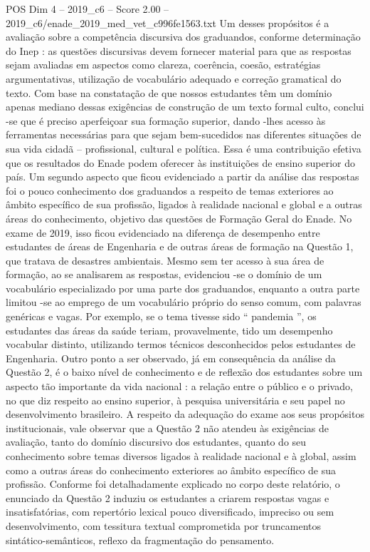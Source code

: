 \begin{textsample}{POS Dim 4 – 2019\_c6 – Score 2.00 – 2019\_c6/enade\_2019\_med\_vet\_c996fe1563.txt}
Um desses propósitos é a avaliação sobre a competência discursiva dos graduandos, conforme determinação do Inep : as questões discursivas devem fornecer material para que as respostas sejam avaliadas em aspectos como clareza, coerência, coesão, estratégias argumentativas, utilização de vocabulário adequado e correção gramatical do texto.
Com base na constatação de que nossos estudantes têm um domínio apenas mediano dessas exigências de construção de um texto formal culto, conclui -se que é preciso aperfeiçoar sua formação superior, dando -lhes acesso às ferramentas necessárias para que sejam bem-sucedidos nas diferentes situações de sua vida cidadã – profissional, cultural e política.
Essa é uma contribuição efetiva que os resultados do Enade podem oferecer às instituições de ensino superior do país.
Um segundo aspecto que ficou evidenciado a partir da análise das respostas foi o pouco conhecimento dos graduandos a respeito de temas exteriores ao âmbito específico de sua profissão, ligados à realidade nacional e global e a outras áreas do conhecimento, objetivo das questões de Formação Geral do Enade.
No exame de 2019, isso ficou evidenciado na diferença de desempenho entre estudantes de áreas de Engenharia e de outras áreas de formação na Questão 1, que tratava de desastres ambientais.
Mesmo sem ter acesso à sua área de formação, ao se analisarem as respostas, evidenciou -se o domínio de um vocabulário especializado por uma parte dos graduandos, enquanto a outra parte limitou -se ao emprego de um vocabulário próprio do senso comum, com palavras genéricas e vagas.
Por exemplo, se o tema tivesse sido “ pandemia ”, os estudantes das áreas da saúde teriam, provavelmente, tido um desempenho vocabular distinto, utilizando termos técnicos desconhecidos pelos estudantes de Engenharia.
Outro ponto a ser observado, já em consequência da análise da Questão 2, é o baixo nível de conhecimento e de reflexão dos estudantes sobre um aspecto tão importante da vida nacional : a relação entre o público e o privado, no que diz respeito ao ensino superior, à pesquisa universitária e seu papel no desenvolvimento brasileiro.
A respeito da adequação do exame aos seus propósitos institucionais, vale observar que a Questão 2 não atendeu às exigências de avaliação, tanto do domínio discursivo dos estudantes, quanto do seu conhecimento sobre temas diversos ligados à realidade nacional e à global, assim como a outras áreas do conhecimento exteriores ao âmbito específico de sua profissão.
Conforme foi detalhadamente explicado no corpo deste relatório, o enunciado da Questão 2 induziu os estudantes a criarem respostas vagas e insatisfatórias, com repertório lexical pouco diversificado, impreciso ou sem desenvolvimento, com tessitura textual comprometida por truncamentos sintático-semânticos, reflexo da fragmentação do pensamento.

\end{textsample}
